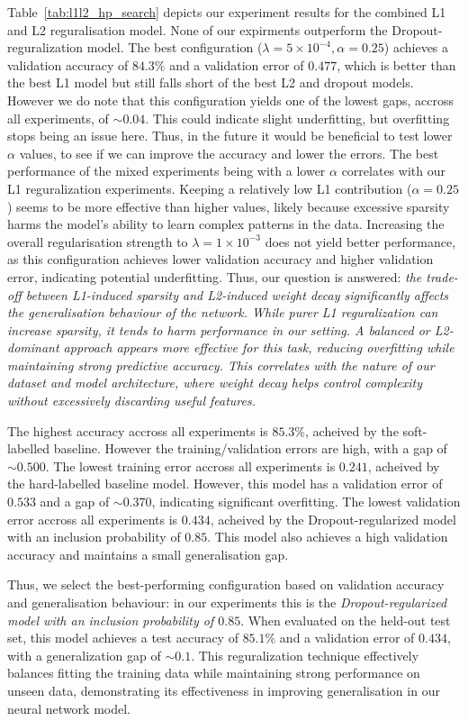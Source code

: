 {{Table~\ref{tab:l1l2_hp_search} depicts our experiment results for the combined L1 and L2 reguralisation model. None of our expirments outperform the Dropout-reguralization model. The best configuration ($\lambda = 5 \times 10^{-4}, \alpha = 0.25$) achieves a validation accuracy of $84.3\%$ and a validation error of $0.477$, which is better than the best L1 model but still falls short of the best L2 and dropout models. However we do note that this configuration yields one of the lowest gaps, accross all experiments, of $\sim0.04$. This could indicate slight underfitting, but overfitting stops being an issue here. Thus, in the future it would be beneficial to test lower $\alpha$ values, to see if we can improve the accuracy and lower the errors. The best performance of the mixed experiments being with a lower $\alpha$ correlates with our L1 reguralization experiments. Keeping a relatively low L1 contribution ($\alpha = 0.25$) seems to be more effective than higher values, likely because excessive sparsity harms the model's ability to learn complex patterns in the data. Increasing the overall regularisation strength to $\lambda = 1 \times 10^{-3}$ does not yield better performance, as this configuration achieves lower validation accuracy and higher validation error, indicating potential underfitting. Thus, our question is answered: \emph{the trade-off between L1-induced sparsity and L2-induced weight decay significantly affects the generalisation behaviour of the network. While purer L1 reguralization can increase sparsity, it tends to harm performance in our setting. A balanced or L2-dominant approach appears more effective for this task, reducing overfitting while maintaining strong predictive accuracy. This correlates with the nature of our dataset and model architecture, where weight decay helps control complexity without excessively discarding useful features.}

The highest accuracy accross all experiments is $85.3\%$, acheived by the soft-labelled baseline. However the training/validation errors are high, with a gap of $\sim0.500$. The lowest training error accross all experiments is $0.241$, acheived by the hard-labelled baseline model. However, this model has a validation error of $0.533$ and a gap of $\sim0.370$, indicating significant overfitting. The lowest validation error accross all experiments is $0.434$, acheived by the Dropout-regularized model with an inclusion probability of $0.85$. This model also achieves a high validation accuracy and maintains a small generalisation gap.

Thus, we select the best-performing configuration based on validation accuracy and generalisation behaviour: in our experiments this is the \textit{Dropout-regularized model with an inclusion probability of $0.85$}. When evaluated on the held-out test set, this model achieves a test accuracy of $85.1\%$ and a validation error of $0.434$, with a generalization gap of $\sim0.1$. This reguralization technique effectively balances fitting the training data while maintaining strong performance on unseen data, demonstrating its effectiveness in improving generalisation in our neural network model.}
}


